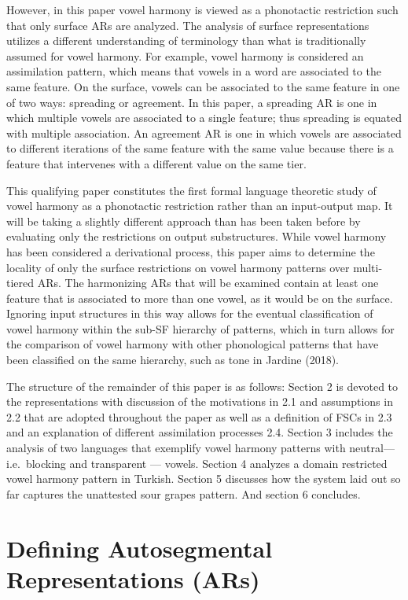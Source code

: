 \documentclass[,doc,floatsintext]{apa6}
\theoremstyle{definition}
\theoremstyle{definition}
\theoremstyle{definition}
\theoremstyle{remark}
\begin{document}
However, in this paper vowel harmony is viewed as a phonotactic
restriction such that only surface ARs are analyzed. The analysis of
surface representations utilizes a different understanding of
terminology than what is traditionally assumed for vowel harmony. For
example, vowel harmony is considered an assimilation pattern, which
means that vowels in a word are associated to the same feature. On the
surface, vowels can be associated to the same feature in one of two
ways: spreading or agreement. In this paper, a spreading AR is one in
which multiple vowels are associated to a single feature; thus spreading
is equated with multiple association. An agreement AR is one in which
vowels are associated to different iterations of the same feature with
the same value because there is a feature that intervenes with a
different value on the same tier.

This qualifying paper constitutes the first formal language theoretic
study of vowel harmony as a phonotactic restriction rather than an
input-output map. It will be taking a slightly different approach than
has been taken before by evaluating only the restrictions on output
substructures. While vowel harmony has been considered a derivational
process, this paper aims to determine the locality of only the surface
restrictions on vowel harmony patterns over multi-tiered ARs. The
harmonizing ARs that will be examined contain at least one feature that
is associated to more than one vowel, as it would be on the surface.
Ignoring input structures in this way allows for the eventual
classification of vowel harmony within the sub-SF hierarchy of patterns,
which in turn allows for the comparison of vowel harmony with other
phonological patterns that have been classified on the same hierarchy,
such as tone in Jardine (2018).

The structure of the remainder of this paper is as follows: Section 2 is
devoted to the representations with discussion of the motivations in 2.1
and assumptions in 2.2 that are adopted throughout the paper as well as
a definition of FSCs in 2.3 and an explanation of different assimilation
processes 2.4. Section 3 includes the analysis of two languages that
exemplify vowel harmony patterns with neutral--- i.e.~blocking and
transparent --- vowels. Section 4 analyzes a domain restricted vowel
harmony pattern in Turkish. Section 5 discusses how the system laid out
so far captures the unattested sour grapes pattern. And section 6
concludes.

\section{Defining Autosegmental Representations
(ARs)}\label{defining-autosegmental-representations-ars}
\end{document}
